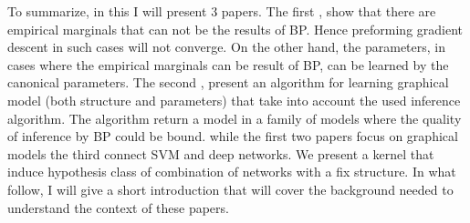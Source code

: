 To summarize, in this I will present $3$ papers.
The first \cite{heinemann2012cannot}, show that there are empirical marginals that can not be the results of BP. 
Hence preforming gradient descent in such cases will not converge. 
On the other hand, the parameters, in cases where the empirical marginals can be result of BP, can be learned by the canonical parameters.
The second \cite{heinemann2014inferning}, present an algorithm for learning graphical model (both structure and parameters) that take into account the used inference algorithm.
The algorithm return a model in a family of models where the quality of inference by BP could be bound.
while the first two papers focus on graphical models the third \cite{heinemann2016improper} connect SVM and deep networks.
We present a kernel that induce hypothesis class of combination of networks with a fix structure.
In what follow, I will give a short introduction that will cover the background needed to understand the context of these papers.
